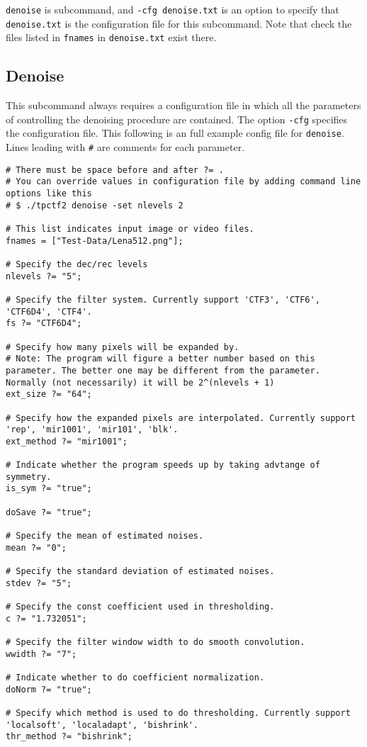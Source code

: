 \documentclass[a4paper,5pt]{article}
\begin{document}
\lstinline{denoise} is subcommand, and \lstinline{-cfg denoise.txt} is an option to specify that \lstinline{denoise.txt} is the configuration file for this subcommand. Note that check the files listed in \lstinline{fnames} in \lstinline{denoise.txt} exist there.

\subsection{Denoise}
This subcommand always requires a configuration file in which all the parameters of controlling the denoising procedure are contained. The option \lstinline{-cfg} specifies the configuration file. This following is an full example config file for \lstinline{denoise}. Lines leading with \lstinline{#} are comments for each parameter.

\begin{lstlisting}
# There must be space before and after ?= .
# You can override values in configuration file by adding command line options like this
# $ ./tpctf2 denoise -set nlevels 2

# This list indicates input image or video files.
fnames = ["Test-Data/Lena512.png"];

# Specify the dec/rec levels
nlevels ?= "5";

# Specify the filter system. Currently support 'CTF3', 'CTF6', 'CTF6D4', 'CTF4'.
fs ?= "CTF6D4";

# Specify how many pixels will be expanded by.
# Note: The program will figure a better number based on this parameter. The better one may be different from the parameter. Normally (not necessarily) it will be 2^(nlevels + 1)
ext_size ?= "64";

# Specify how the expanded pixels are interpolated. Currently support 'rep', 'mir1001', 'mir101', 'blk'.
ext_method ?= "mir1001";

# Indicate whether the program speeds up by taking advtange of symmetry.
is_sym ?= "true";

doSave ?= "true";

# Specify the mean of estimated noises.
mean ?= "0";

# Specify the standard deviation of estimated noises.
stdev ?= "5";

# Specify the const coefficient used in thresholding.
c ?= "1.732051";

# Specify the filter window width to do smooth convolution.
wwidth ?= "7";

# Indicate whether to do coefficient normalization.
doNorm ?= "true";

# Specify which method is used to do thresholding. Currently support 'localsoft', 'localadapt', 'bishrink'.
thr_method ?= "bishrink";
\end{lstlisting}
\end{document}
